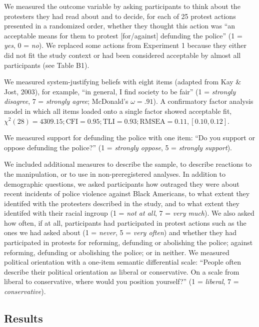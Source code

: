 \documentclass[12pt, letterpaper]{article}
\begin{document}
We measured the outcome variable by asking participants to think about
the protesters they had read about and to decide, for each of 25 protest
actions presented in a randomized order, whether they thought this
action was ``an acceptable means for them to protest {[}for/against{]}
defunding the police'' (1 = \emph{yes}, 0 = \emph{no}). We replaced some
actions from Experiment 1 because they either did not fit the study
context or had been considered acceptable by almost all participants
(see Table B1).

We measured system-justifying beliefs with eight items (adapted from Kay
\& Jost, 2003), for example, ``in general, I find society to be fair''
(1 = \emph{strongly disagree}, 7 = \emph{strongly agree}; McDonald's
\(\omega = .91\)). A confirmatory factor analysis model in which all
items loaded onto a single factor showed acceptable fit,
\(\chi^2 (28) = 4309.15; \text{CFI} = 0.95; \text{TLI} = 0.93; \text{RMSEA} = 0.11, [0.10, 0.12]\).

We measured support for defunding the police with one item: ``Do you
support or oppose defunding the police?'' (1 = \emph{strongly oppose}, 5
= \emph{strongly support}).

We included additional measures to describe the sample, to describe
reactions to the manipulation, or to use in non-preregistered analyses.
In addition to demographic questions, we asked participants how outraged
they were about recent incidents of police violence against Black
Americans, to what extent they identifed with the protesters described
in the study, and to what extent they identifed with their racial
ingroup (1 = \emph{not at all}, 7 = \emph{very much}). We also asked how
often, if at all, participants had participated in protest actions such
as the ones we had asked about (1 = \emph{never}, 5 = \emph{very often})
and whether they had participated in protests for reforming, defunding
or abolishing the police; against reforming, defunding or abolishing the
police; or in neither. We measured political orientation with a one-item
semantic differential scale: ``People often describe their political
orientation as liberal or conservative. On a scale from liberal to
conservative, where would you position yourself?'' (1 = \emph{liberal},
7 = \emph{conservative}).

\hypertarget{results-1}{%
\subsection{Results}\label{results-1}}
\end{document}
